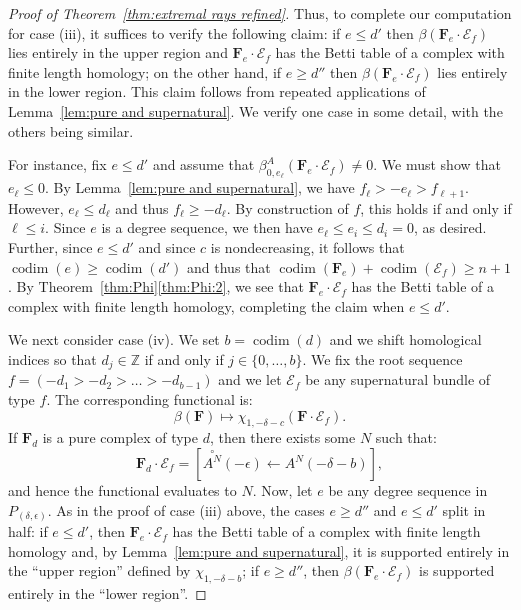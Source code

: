\documentclass[12pt]{amsart}
\theoremstyle{definition}
\theoremstyle{remark}
\newcommand{\codim}{\operatorname{codim}}
\newcommand{\ZZ}{\mathbb{Z}}
\newcommand{\cc}{c}
\newcommand{\dd}{d}
\newcommand{\cE}{\mathcal{E}}
\newcommand{\FF}{\mathbf{F}}
\newcommand{\zp}{\circ}
\begin{document}
\begin{proof}[Proof of Theorem~\ref{thm:extremal rays refined}]
Thus, to complete our computation for case (iii), it suffices to verify the following claim: if $e\leq d'$ then $\beta(\FF_e\cdot \cE_f)$ lies entirely in the upper region and $\FF_e\cdot \cE_f$ has the Betti table of a complex with finite length homology; on the other hand, if $e\geq d''$ then $\beta(\FF_e\cdot \cE_f)$ lies entirely in the lower region.  This claim follows from repeated applications of Lemma~\ref{lem:pure and supernatural}.  We verify one case in some detail, with the others being similar.  

For instance, fix $e\leq d'$ and assume that $\beta_{0,e_\ell}^A(\FF_e\cdot \cE_f)\ne 0$.  We must show that $e_{\ell}\leq 0$.  By Lemma~\ref{lem:pure and supernatural}, we have
$
f_{\ell}>-e_{\ell}>f_{\ell+1}.
$
However, $e_{\ell}\leq d_{\ell}$ and thus $f_{\ell}\geq -d_{\ell}$.  By construction of $f$, this holds if and only if $\ell \leq i$.  Since $e$ is a degree sequence, we then have $e_{\ell}\leq e_i\leq d_i=0$, as desired.  Further, since $e\leq d'$ and since $\cc$ is nondecreasing, it follows that $\codim(e)\geq \codim(d')$ and thus that $\codim(\FF_e)+\codim(\cE_f)\geq n+1$.  By Theorem~\ref{thm:Phi}\eqref{thm:Phi:2}, we see that $\FF_e\cdot \cE_f$ has the Betti table of a complex with finite length homology, completing the claim when $e\leq d'$.  

We next consider case (iv).  We set $b=\codim(d)$ and we shift homological indices so that $d_j\in \ZZ$ if and only if $j\in \{0, \dots, b\}$.
We fix the root sequence $f=(-d_{1}>-d_{2}>\dots>-d_{b-1})$ and we let $\cE_f$ be any supernatural bundle of type $f$.   The corresponding functional is:
\[
\beta(\FF)\mapsto \chi_{1,-\delta-c}(\FF\cdot \cE_f).
\]
If $\FF_d$ is a pure complex of type $\dd$, then there exists some $N$ such that:
\[
\FF_d\cdot \cE_f=\left[ \overset{\zp}{A^N}(-\epsilon)\gets A^N(-\delta-b) \right],
\]
and hence the functional evaluates to $N$.  
Now, let $e$ be any degree sequence in $P_{(\delta,\epsilon)}$.  As in the proof of case (iii) above, the cases $e\geq d''$ and $e\leq d'$ split in half:
if $e\leq d'$, then $\FF_e\cdot \cE_f$ has the Betti table of a complex with finite length homology and, by Lemma~\ref{lem:pure and supernatural}, it is supported entirely in the ``upper region'' defined by $\chi_{1,-\delta-b}$; if $e\geq d''$, then $\beta(\FF_e\cdot \cE_f)$ is supported entirely in the ``lower region''.


\end{proof}
\end{document}
